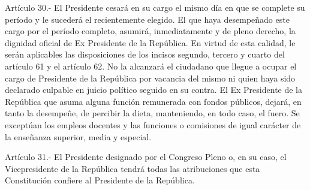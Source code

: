     Artículo 30.- El Presidente cesará en su cargo el mismo día en que se complete su período y le sucederá el recientemente elegido.
    El que haya desempeñado este cargo por el período completo, asumirá, inmediatamente y de pleno derecho, la dignidad oficial de Ex Presidente de la República.
    En virtud de esta calidad, le serán aplicables las disposiciones de los incisos segundo, tercero y cuarto del artículo 61 y el artículo 62.
    No la alcanzará el ciudadano que llegue a ocupar el cargo de Presidente de la República por vacancia del mismo ni quien haya sido declarado culpable en juicio político seguido en su contra.
    El Ex Presidente de la República que asuma alguna función remunerada con fondos públicos, dejará, en tanto la desempeñe, de percibir la dieta, manteniendo, en todo caso, el fuero. Se exceptúan los empleos docentes y las funciones o comisiones de igual carácter de la enseñanza superior, media y especial.



    Artículo 31.- El Presidente designado por el Congreso Pleno o, en su caso, el Vicepresidente de la República tendrá todas las atribuciones que esta Constitución confiere al Presidente de la República.


